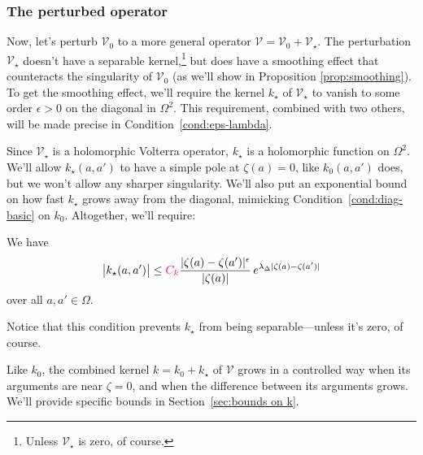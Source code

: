 \documentclass{article}
\makeatletter
\theoremstyle{plain}
\newcommand{\condconst}[2]{\item[($\text{\textsc{#1}} \mid #2$)]\protected@edef\@currentlabel{$\text{\textsc{#1}} \mid #2$}}
\newcommand{\volterra}{\mathcal{V}}
\newcommand{\hardpart}{\mathcal{V}_0}
\newcommand{\softpart}{\mathcal{V}_\star}
\newcommand{\hardker}{k_0}
\newcommand{\softker}{k_\star}
\newcommand{\domain}{\Omega}
\makeatother
\begin{document}
\subsubsection{The perturbed operator}\label{setting:perturbed}

Now, let's perturb $\hardpart$ to a more general operator $\volterra=\hardpart +\softpart$. The perturbation $\softpart$ doesn't have a separable kernel,\footnote{Unless $\softpart$ is zero, of course.} but does have a smoothing effect that counteracts the singularity of $\hardpart$ (as we'll show in Proposition \ref{prop:smoothing}). To get the smoothing effect, we'll require the kernel $\softker$ of $\softpart$ to vanish to some order $\epsilon > 0$ on the diagonal in $\Omega^2$. This requirement, combined with two others, will be made precise in Condition~\eqref{cond:eps-lambda}.

Since $\softpart$ is a holomorphic Volterra operator, $\softker$ is a holomorphic function on $\domain^2$. We'll allow $\softker(a, a')$ to have a simple pole at $\zeta(a) = 0$, like $\hardker(a, a')$ does, but we won't allow any sharper singularity. We'll also put an exponential bound on how fast $\softker$ grows away from the diagonal, mimicking Condition~\eqref{cond:diag-basic} on $\hardker$. Altogether, we'll require:
\begin{conditions}
\condconst{diag$_\star$}{\epsilon, \lambda_\Delta}\label{cond:eps-lambda} We have
\[ \big| \softker(a, a') \big| \leq \textcolor{magenta}{C_k}\frac{|\zeta(a)-\zeta(a')|^\epsilon}{|\zeta(a)|}\,e^{\lambda_\Delta|\zeta(a)-\zeta(a')|}\]
over all $a, a' \in \domain$.
\end{conditions}
Notice that this condition prevents $\softker$ from being separable---unless it's zero, of course.

Like $\hardker$, the combined kernel $k = \hardker + \softker$ of $\volterra$ grows in a controlled way when its arguments are near $\zeta = 0$, and when the difference between its arguments grows. We'll provide specific bounds in Section~\ref{sec:bounds on k}. 
\end{document}
